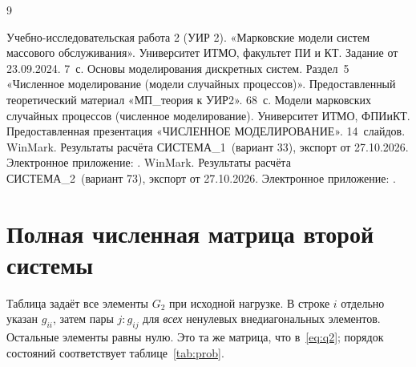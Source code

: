 \documentclass[a4paper,12pt]{article}
\newcommand{\sysone}{СИСТЕМА\_1}
\newcommand{\systwo}{СИСТЕМА\_2}
\begin{document}
\clearpage
\renewcommand{\refname}{Список использованных материалов}
\begin{thebibliography}{9}
 Учебно-исследовательская работа 2 (УИР 2). «Марковские модели систем массового обслуживания». Университет ИТМО, факультет ПИ и КТ. Задание от 23.09.2024. 7~с.
 Основы моделирования дискретных систем. Раздел~5 «Численное моделирование (модели случайных процессов)». Предоставленный теоретический материал «МП\_теория к УИР2». 68~с.
 Модели марковских случайных процессов (численное моделирование). Университет ИТМО, ФПИиКТ. Предоставленная презентация «ЧИСЛЕННОЕ МОДЕЛИРОВАНИЕ». 14~слайдов.
 WinMark. Результаты расчёта \sysone\ (вариант 33), экспорт от 27.10.2026. Электронное приложение: .
 WinMark. Результаты расчёта \systwo\ (вариант 73), экспорт от 27.10.2026. Электронное приложение: .
\end{thebibliography}

\appendix
\clearpage
\section{Полная численная матрица второй системы}\label{app:matrix}
Таблица задаёт все элементы $G_2$ при исходной нагрузке. В строке $i$ отдельно указан $g_{ii}$, затем пары $j:g_{ij}$ для \emph{всех} ненулевых внедиагональных элементов. Остальные элементы равны нулю. Это та же матрица, что в~\eqref{eq:q2}; порядок состояний соответствует таблице~\ref{tab:prob}.
\end{document}
